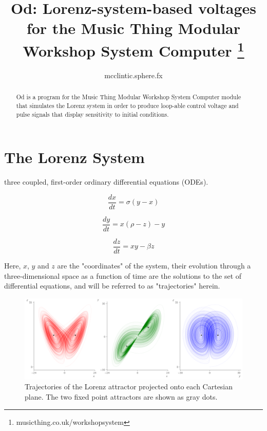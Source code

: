 \documentclass{tufte-handout}
\title{Od: Lorenz-system-based voltages for the Music Thing Modular Workshop System Computer
\thanks{musicthing.co.uk/workshopsystem}}
\author[mcclintic.sphere.fx]{mcclintic.sphere.fx}
\begin{document}
\maketitle%

\begin{abstract}
\noindent
Od is a program for the Music Thing Modular Workshop System Computer
module that simulates the Lorenz system in order to produce loop-able 
control voltage and pulse signals that display sensitivity to initial conditions.
\end{abstract}


\section{The Lorenz System}\label{sec:the-lorenz-system}

 three coupled, first-order ordinary differential equations (ODEs).

$$\frac{dx}{dt} = \sigma(y - x)$$

$$\frac{dy}{dt} = x(\rho - z) - y$$

$$\frac{dz}{dt} = x y - \beta z$$

Here, $x$, $y$ and $z$ are the "coordinates" of the system, their evolution through a three-dimensional space as a function of time are the solutions to the set of differential equations, and will be referred to as "trajectories" herein.

\begin{figure}[h]
  \includegraphics[width=\linewidth]{lorenz_attractor.png}%
  \caption{Trajectories of the Lorenz attractor projected onto each Cartesian plane. The two fixed point attractors are shown as gray dots.}%
  \label{fig:fullfig}%
\end{figure}
\end{document}
